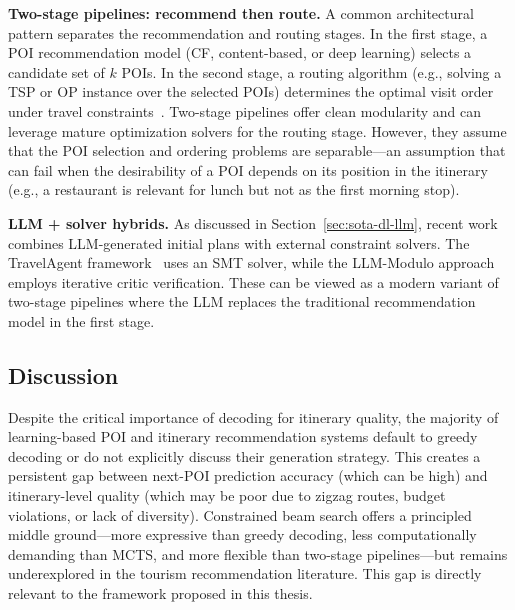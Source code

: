 \textbf{Two-stage pipelines: recommend then route.} A common architectural pattern separates the recommendation and routing stages. In the first stage, a POI recommendation model (CF, content-based, or deep learning) selects a candidate set of $k$ POIs. In the second stage, a routing algorithm (e.g., solving a TSP or OP instance over the selected POIs) determines the optimal visit order under travel constraints~\cite{kotiloglu2017topk, gavalas2014ttdp}. Two-stage pipelines offer clean modularity and can leverage mature optimization solvers for the routing stage. However, they assume that the POI selection and ordering problems are separable---an assumption that can fail when the desirability of a POI depends on its position in the itinerary (e.g., a restaurant is relevant for lunch but not as the first morning stop).

\textbf{LLM + solver hybrids.} As discussed in Section~\ref{sec:sota-dl-llm}, recent work combines LLM-generated initial plans with external constraint solvers. The TravelAgent framework~\cite{fan2024travelagent} uses an SMT solver, while the LLM-Modulo approach~\cite{kambhampati2024llmmodulo} employs iterative critic verification. These can be viewed as a modern variant of two-stage pipelines where the LLM replaces the traditional recommendation model in the first stage.

\subsection{Discussion}
\label{sec:sota-decoding-discussion}

Despite the critical importance of decoding for itinerary quality, the majority of learning-based POI and itinerary recommendation systems default to greedy decoding or do not explicitly discuss their generation strategy. This creates a persistent gap between next-POI prediction accuracy (which can be high) and itinerary-level quality (which may be poor due to zigzag routes, budget violations, or lack of diversity). Constrained beam search offers a principled middle ground---more expressive than greedy decoding, less computationally demanding than MCTS, and more flexible than two-stage pipelines---but remains underexplored in the tourism recommendation literature. This gap is directly relevant to the framework proposed in this thesis.

